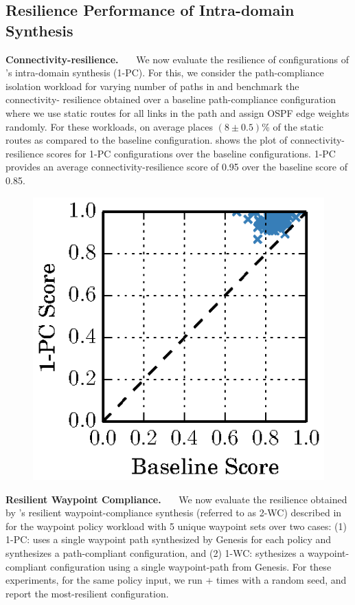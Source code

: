 \subsection{Resilience Performance of Intra-domain Synthesis} \label{sec:reseval}
\noindent\textbf{Connectivity-resilience.}~~~
We now evaluate the resilience of configurations 
of \name's intra-domain synthesis (1-PC).
For this, 
we consider the path-compliance isolation workload for
varying number of paths 
in  and benchmark the connectivity-
resilience obtained over a baseline path-compliance 
configuration 
where we use static routes for all links in the path and 
assign OSPF edge weights randomly. For these workloads,
\name on average places 
$(8 \pm 0.5)$\% of the static routes as 
compared to the baseline configuration. 
shows the plot of connectivity-resilience scores for 
1-PC configurations over the baseline configurations. 
1-PC provides an average connectivity-resilience score 
of 0.95 over the baseline score 
of 0.85.

\begin{figure}
	\begin{center}
		\includegraphics[width=0.20\columnwidth]{figures/ospfbaselineresilience.eps}
	\end{center} 
\end{figure}


\noindent\textbf{Resilient Waypoint Compliance.}~~~
We now evaluate the resilience obtained by \name's
resilient waypoint-compliance synthesis (referred to as 2-WC)
described in 
for the waypoint policy workload with 5 unique waypoint sets 
over two cases: (1) 1-PC: \name uses a single waypoint path
synthesized by Genesis for each policy 
and synthesizes a path-compliant configuration, and 
(2) 1-WC: \name sythesizes a waypoint-compliant configuration
using a single waypoint-path from Genesis. For these 
experiments, for the same policy input, we run \genesis +  times with a random seed, and report the most-resilient configuration.

